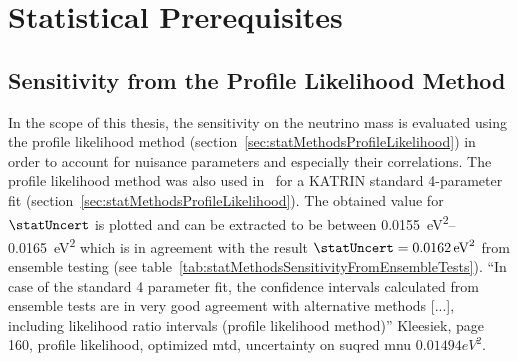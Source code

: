 \def\currentRootFolder{chapter/sensitivityStudyWithPreliminaryKatrinElossModel/statisticalPrerequisites}
\def\currentFigureFolder{\currentRootFolder/fig}



\section{Statistical Prerequisites}
\subsection{Sensitivity from  the Profile Likelihood Method}
In the scope of this thesis, the sensitivity on the neutrino mass is evaluated using the profile likelihood method (section~\ref{sec:statMethodsProfileLikelihood}) in order to account for nuisance parameters and especially their correlations. The profile likelihood method was also used in~\cite{Kleesiek2014} for a KATRIN standard 4-parameter fit (section~\ref{sec:statMethodsProfileLikelihood}). The obtained value for $\statUncert$ is plotted and can be extracted to be between \SIrange[range-phrase=--]{0.0155}{0.0165}{eV^2} which is in agreement with the result $\statUncert=\SI{0.0162}{eV^2}$ from ensemble testing (see table~\ref{tab:statMethodsSensitivityFromEnsembleTests}). ``In case of the standard 4 parameter fit, the confidence intervals calculated from ensemble tests are in very good agreement with alternative methods [...], including likelihood ratio intervals (profile likelihood method)'' Kleesiek, page 160, profile likelihood, optimized mtd, uncertainty on suqred mnu $0.01494 eV^2$.




